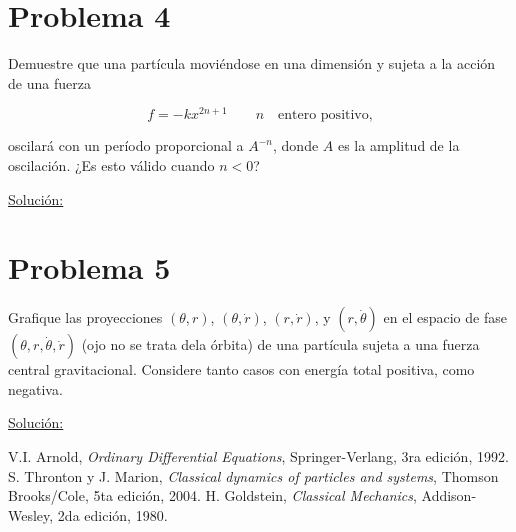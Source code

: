 \documentclass[a4paper,10pt]{article}
\numberwithin{equation}{section}
\begin{document}
\section{Problema 4}

Demuestre que una partícula moviéndose en una dimensión y sujeta a la 
acción de una fuerza 

$$ 
f = -kx^{2n+1} \qquad n \quad \text{entero positivo,}
$$

oscilará con un período proporcional a $A^{-n}$, donde $A$ es la amplitud 
de la oscilación. ¿Es esto válido cuando $n<0$?

\vspace{.3cm}

\underline{Solución:} \vspace{.3cm}

\section{Problema 5}

Grafique las proyecciones $(\theta,r)$, $(\theta,\dot{r})$, $(r,\dot{r})$,
y $(r,\dot{\theta})$ en el espacio de fase $(\theta,r,\dot{\theta},\dot{r})$
(ojo no se trata dela órbita) de una partícula sujeta a una fuerza central 
gravitacional. Considere tanto casos con energía total positiva, como 
negativa.

\vspace{.3cm}

\underline{Solución:} \vspace{.3cm}

\begin{thebibliography}{10}
 V.I. Arnold, \emph{Ordinary Differential Equations}, Springer-Verlang,
 3ra edición, 1992.
 S. Thronton y J. Marion, \textit{Classical dynamics of particles and systems}, Thomson Brooks/Cole,
 5ta edición, 2004.
 H. Goldstein, \emph{Classical Mechanics}, Addison-Wesley, 2da edición,
 1980.
\end{thebibliography}
\end{document}
